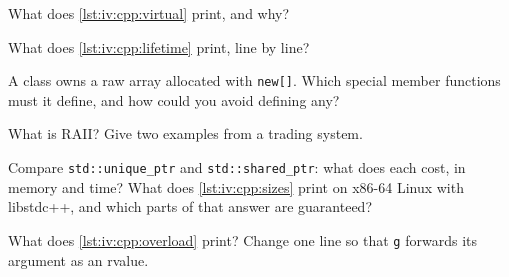 \label{lst:iv:cpp:virtual}

\begin{interviewq}\label{iq:iv:cpp:1}
What does \cref{lst:iv:cpp:virtual} print, and why?
\end{interviewq}

\label{lst:iv:cpp:lifetime}

\begin{interviewq}\label{iq:iv:cpp:2}
What does \cref{lst:iv:cpp:lifetime} print, line by line?
\end{interviewq}

\begin{interviewq}\label{iq:iv:cpp:3}
A class owns a raw array allocated with \texttt{new[]}. Which special member functions must it define, and how could you avoid
defining any?
\end{interviewq}

\begin{interviewq}\label{iq:iv:cpp:4}
What is RAII? Give two examples from a trading system.
\end{interviewq}

\label{lst:iv:cpp:sizes}

\begin{interviewq}\label{iq:iv:cpp:5}
Compare \texttt{std::unique\_ptr} and \texttt{std::shared\_ptr}: what does each cost, in memory and time? What does
\cref{lst:iv:cpp:sizes} print on x86-64 Linux with libstdc++, and which parts of that answer are guaranteed?
\end{interviewq}

\begin{interviewq}\label{iq:iv:cpp:6}
What does \cref{lst:iv:cpp:overload} print? Change one line so that \texttt{g} forwards its argument as an rvalue.
\end{interviewq}

\label{lst:iv:cpp:view}

